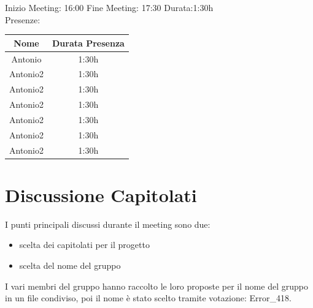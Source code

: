 \documentclass[12pt,a4paper]{article}
\begin{document}
\vspace{15mm}
Inizio Meeting: 16:00 \hspace{4mm} Fine Meeting: 17:30 \hspace{4mm}
Durata:1:30h \\
\vspace{4mm}
Presenze:
\begin{center}
    \begin{tabular}{ |c|c| }
        \hline
        Nome     & Durata Presenza \\
        \hline
        Antonio  & 1:30h           \\
        \hline
        Antonio2 & 1:30h           \\
        \hline
        Antonio2 & 1:30h           \\
        \hline
        Antonio2 & 1:30h           \\
        \hline
        Antonio2 & 1:30h           \\
        \hline
        Antonio2 & 1:30h           \\
        \hline
        Antonio2 & 1:30h           \\
        \hline
    \end{tabular}
\end{center}

\newpage

\section{Discussione Capitolati}
I punti principali discussi durante il meeting sono due:
\begin{itemize}
    \item scelta dei capitolati per il progetto
    \item scelta del nome del gruppo
\end{itemize}

I vari membri del gruppo hanno raccolto le loro proposte per il nome del gruppo
in
un file condiviso, poi il nome è stato scelto tramite votazione: Error\_418.
\end{document}
